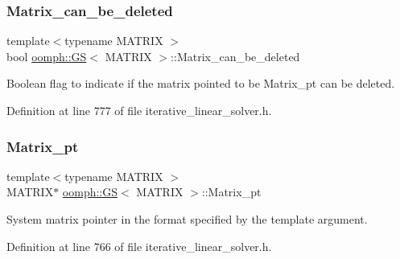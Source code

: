 \mbox{\label{classoomph_1_1GS_a718861f4e791d4db2838dfb08dd846a2}} 
\subsubsection{\texorpdfstring{Matrix\+\_\+can\+\_\+be\+\_\+deleted}{Matrix\_can\_be\_deleted}}
{\footnotesize\ttfamily template$<$typename M\+A\+T\+R\+IX $>$ \\
bool \hyperlink{classoomph_1_1GS}{oomph\+::\+GS}$<$ M\+A\+T\+R\+IX $>$\+::Matrix\+\_\+can\+\_\+be\+\_\+deleted\hspace{0.3cm}{\ttfamily [private]}}



Boolean flag to indicate if the matrix pointed to be Matrix\+\_\+pt can be deleted. 



Definition at line 777 of file iterative\+\_\+linear\+\_\+solver.\+h.

\mbox{\label{classoomph_1_1GS_aac984c7e63198b6b6d8b32685f45c592}} 
\subsubsection{\texorpdfstring{Matrix\+\_\+pt}{Matrix\_pt}}
{\footnotesize\ttfamily template$<$typename M\+A\+T\+R\+IX $>$ \\
M\+A\+T\+R\+IX$\ast$ \hyperlink{classoomph_1_1GS}{oomph\+::\+GS}$<$ M\+A\+T\+R\+IX $>$\+::Matrix\+\_\+pt\hspace{0.3cm}{\ttfamily [private]}}



System matrix pointer in the format specified by the template argument. 



Definition at line 766 of file iterative\+\_\+linear\+\_\+solver.\+h.

\mbox{\label{classoomph_1_1GS_a8010d1c317927e493c22010623a10c04}} 
